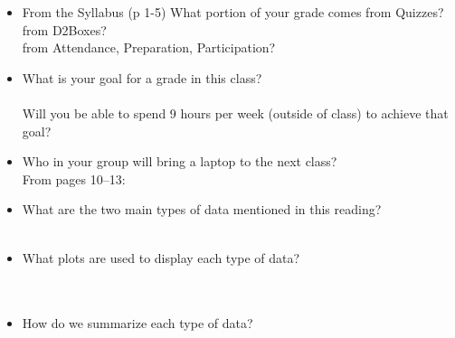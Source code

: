  \begin{itemize}
    \item From the Syllabus (p 1-5) 
       What portion of your grade comes from Quizzes?\\
       from D2Boxes?\\
       from Attendance, Preparation, Participation?
    \item  What is your goal for a grade in this class?\\ \\
       Will you be able to spend 9 hours per week (outside of
       class) to achieve that goal?\\
     \item Who in your group will bring a laptop to the next class?\\

       From pages 10--13:
     \item What are the two main types of data mentioned in this
       reading?\\ \\
     \item What plots are used to display each type of data? \\ \\ \\
     \item How do we summarize each type of data?\\ \\ 

 \end{itemize}